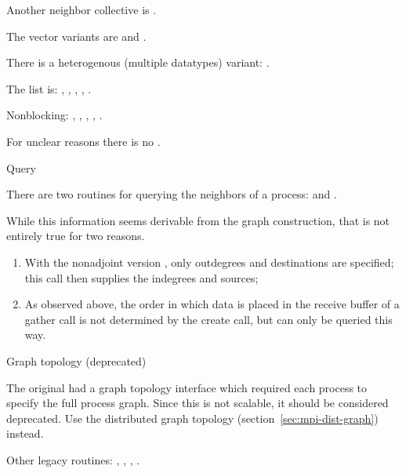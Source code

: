Another neighbor collective is .

The vector variants are
and
.

There is a heterogenous (multiple datatypes) variant:
.

The list is: ,
,
,
,
.

Nonblocking:
,
,
,
,
.

For unclear reasons there is no .

 {Query}
\label{sec:graph-neighbors}

There are two routines for querying the neighbors of a process:
%
and
.

While this information seems derivable from the graph construction,
that is not entirely true for two reasons.
\begin{enumerate}
\item With the nonadjoint version ,
  only outdegrees and destinations are specified; this call then supplies
  the indegrees and sources;
\item As observed above, the order in which data is placed in the
  receive buffer of a gather call is not determined by the create call,
  but can only be queried this way.
\end{enumerate}

 {Graph topology (deprecated)}
\label{sec:mpi-1-graph}

The original  had a graph topology interface
which required each process to specify the full process graph. Since
this is not scalable, it should be considered deprecated. Use the
distributed graph topology (section~\ref{sec:mpi-dist-graph}) instead.

Other legacy routines: 
,
,
,
.

